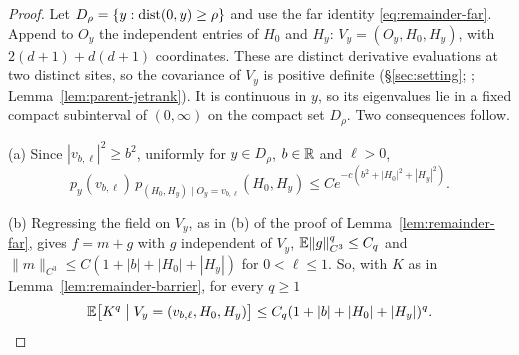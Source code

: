 \begin{proof}
Let $D_\rho=\{y:\operatorname{dist}(0,y)\ge\rho\}$ and use the far identity \eqref{eq:remainder-far}. Append to $O_y$ the independent entries of $H_0$ and $H_y$: $V_y=(O_y,H_0,H_y)$, with $2(d+1)+d(d+1)$ coordinates. These are distinct derivative evaluations at two distinct sites, so the covariance of $V_y$ is positive definite (\S\ref{sec:setting}; \cite[\S2]{parentP}; Lemma~\ref{lem:parent-jetrank}). It is continuous in $y$, so its eigenvalues lie in a fixed compact subinterval of $(0,\infty)$ on the compact set $D_\rho$. Two consequences follow.

(a) Since $|v_{b,\ell}|^2\ge b^2$, uniformly for $y\in D_\rho$, $b\in\mathbb R$ and $\ell>0$,
\begin{equation}\label{eq:remainder-farrate-dens}
p_y(v_{b,\ell})\,p_{(H_0,H_y)\mid O_y=v_{b,\ell}}(H_0,H_y)\le Ce^{-c(b^2+|H_0|^2+|H_y|^2)} .
\end{equation}

(b) Regressing the field on $V_y$, as in (b) of the proof of Lemma~\ref{lem:remainder-far}, gives $f=m+g$ with $g$ independent of $V_y$, $\mathbb E\|g\|_{C^3}^q\le C_q$ and $\|m\|_{C^3}\le C(1+|b|+|H_0|+|H_y|)$ for $0<\ell\le1$. So, with $K$ as in Lemma~\ref{lem:remainder-barrier}, for every $q\ge1$
\begin{equation}\label{eq:remainder-farrate-K}
\mathbb E\bigl[K^q\bigm|V_y=(v_{b,\ell},H_0,H_y)\bigr]\le C_q(1+|b|+|H_0|+|H_y|)^q .
\end{equation}


\end{proof}
